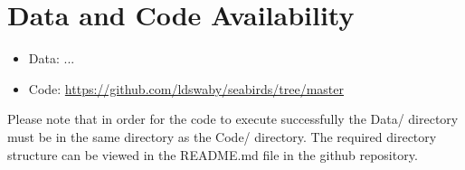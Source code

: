 \documentclass[11pt]{article}
\begin{document}
    
    \newpage
    \nolinenumbers
    \section*{Data and Code Availability}
    
    \begin{itemize}
      \item  Data: ...
      \item Code: \url{https://github.com/ldswaby/seabirds/tree/master}
    \end{itemize}
    
    \noindent Please note that in order for the code to execute successfully the Data/ directory must be in the same directory as the Code/ directory. The required directory structure can be viewed in the README.md file in the github repository.

    \newpage
    
    
\end{document}
